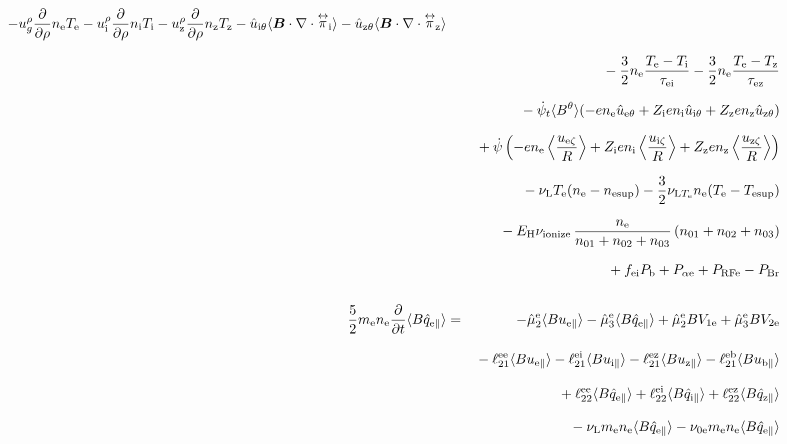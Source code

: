 \documentclass[11pt]{article}
\def\bvec#1{\leavevmode\hbox{\boldmath$#1$}}
\let\vec=\bvec
\def\r#1{{\rm#1}}
\def\ave#1{\left\langle#1\right\rangle}
\def\aves#1{\langle#1\rangle}
\def\dd#1#2{\frac{\partial #1}{\partial #2}}
\def\tensor#1{\mathord{\displaystyle\mathop{#1}^\leftrightarrow}}
\def\para{\parallel}
\def\ddrho{\frac{\partial}{\partial\rho}}
\def\ddt{\frac{\partial}{\partial t}}
\def\psid{\dot{\psi}}
\def\psit{\psi_t}
\def\psitd{\dot{\psit}}
\def\me{m_\r{e}}
\def\mb{m_\r{b}}
\def\nee{n_\r{e}}
\def\ni{n_\r{i}}
\def\nz{n_\r{z}}
\def\Te{T_\r{e}}
\def\Ti{T_\r{i}}
\def\Tz{T_\r{z}}
\def\Zi{Z_\r{i}}
\def\Zz{Z_\r{z}}
\def\uzt#1{u_{\r{#1}\zeta}}
\def\upara#1{u_{\r{#1}\para}}
\def\uhatth#1{\hat{u}_{\r{#1}\theta}}
\def\qhatpara#1{\hat{q}_{\r{#1}\para}}
\def\urho#1{u_\r{#1}^\rho}
\def\ugrho{u_{g}^\rho}
\def\nun#1{\nu_\r{0#1}}
\def\nsup#1{n_\r{#1sup}}
\def\Tsup#1{T_\r{#1sup}}
\def\nuLT#1{\nu_{\r{L}T_\r{#1}}}
\def\PRF#1{P_\r{RF#1}}
\def\Palp#1{P_{\alpha\r{#1}}}
\def\fei{f_\r{ei}}
\def\PBr{P_\r{Br}}
\def\Pb{P_\r{b}}
\def\Eb{E_\r{b}}
\def\EH{E_\r{H}}
\def\nna{n_{01}}
\def\nnb{n_{02}}
\def\nnc{n_{03}}
\def\nuL{\nu_\r{L}}
\def\nuion{\nu_\r{ionize}}
\begin{document}
\begin{eqnarray}
%
  - \ugrho \ddrho \nee \Te
%
  - \urho{i} \ddrho \ni  \Ti
  - \urho{z} \ddrho \nz  \Tz
  - \uhatth{i} \aves{\vec{B}\cdot\nabla\cdot\tensor{\pi}_\r{i}}
  - \uhatth{z} \aves{\vec{B}\cdot\nabla\cdot\tensor{\pi}_\r{z}}
\nonumber\\[2.5mm]&&{}
%
  - \frac{3}{2} \nee \frac{ \Te - \Ti }{\tau_\r{ei}}
  - \frac{3}{2} \nee \frac{ \Te - \Tz }{\tau_\r{ez}}
\nonumber\\[2.5mm]&&{}
%
%
  - \dot{\psi}_t \aves{B^\theta} (-     e \nee \uhatth{e}
                                  + \Zi e \ni  \uhatth{i}
                                  + \Zz e \nz  \uhatth{z})
\nonumber\\[2.5mm]&&{}
%
%
  +\dot{\psi}\left(-     e \nee \ave{\frac{\uzt{e}}{R}}
	           + \Zi e \ni  \ave{\frac{\uzt{i}}{R}}
	           + \Zz e \nz  \ave{\frac{\uzt{z}}{R}}\right)
\nonumber\\[2.5mm]&&{}
%
  - \nuL \Te (\nee - \nsup{e})
%
  - \frac{3}{2} \nuLT{e} \nee (\Te - \Tsup{e})
%
\nonumber\\[2.5mm]&&{}
  - \EH \nuion\, \frac{\nee}{\nna + \nnb + \nnc}\, (\nna + \nnb + \nnc)
\nonumber\\[2.5mm]&&{}
%
  + \fei \Pb
%
%
  + \Palp{e}
%
  + \PRF{e}
%
  - \PBr
\\[5mm]
 \frac{5}{2} \me \nee \ddt \aves{B \qhatpara{e}} &=&
%
  - \hat{\mu}_2^\r{e} \aves{B \upara{e}} 
  - \hat{\mu}_3^\r{e} \aves{B \qhatpara{e}}
%
  + \hat{\mu}_2^\r{e} {B V_{1\r{e}}} 
  + \hat{\mu}_3^\r{e} {B V_{2\r{e}}}
\nonumber\\[3mm]&&{}
%
  - \ell_{21}^{\r{ee}} \aves{B \upara{e}}
  - \ell_{21}^{\r{ei}} \aves{B \upara{i}}
  - \ell_{21}^{\r{ez}} \aves{B \upara{z}}
  - \ell_{21}^{\r{eb}} \aves{B \upara{b}}
\nonumber\\[3mm]&&{}
%
  + \ell_{22}^{\r{ee}} \aves{B \qhatpara{e}}
  + \ell_{22}^{\r{ei}} \aves{B \qhatpara{i}}
  + \ell_{22}^{\r{ez}} \aves{B \qhatpara{z}}
\nonumber\\[3mm]&&{}
%
  - \nuL \me \nee \aves{B \qhatpara{e}}
%
  - \nun{e} \me \nee \aves{B \qhatpara{e}}
\end{eqnarray}
%
\end{document}
